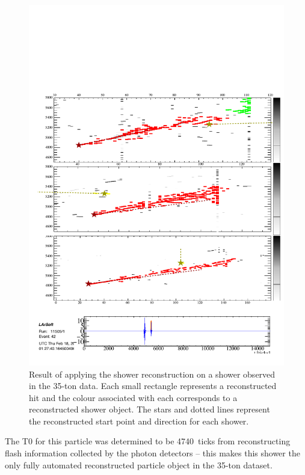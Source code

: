 \begin{figure}
  \centering
  \includegraphics[width=12cm]{FamousShowerReconstructed.pdf}
  \caption[Result of applying the shower reconstruction on a shower observed in the 35-ton data.]{Result of applying the shower reconstruction on a shower observed in the 35-ton data.  Each small rectangle represents a reconstructed hit and the colour associated with each corresponds to a reconstructed shower object.  The stars and dotted lines represent the reconstructed start point and direction for each shower.}
  \label{fig:FamousShowerReconstructed}
\end{figure}

The T0 for this particle was determined to be 4740~ticks from reconstructing flash information collected by the photon detectors -- this makes this shower the only fully automated reconstructed particle object in the 35-ton dataset.

